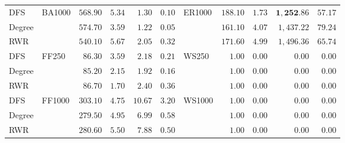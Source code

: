 \begin{table}[b]
{\begin{tabular}{
        |l||
        l|
        r
        r|
        r
        r||
        l|
        r
        r|
        r
        r|
      }
      \hline
      DFS    & \multirow{3}{*}{ BA1000 } & $568.90$                         & $5.34$                           & $1.30$          & $0.10$                           & \multirow{3}{*}{ ER1000 }       & $\mathbf{188.10}$ & $\mathbf{1.73}$ & $\mathbf{1,252}.86$ & $\mathbf{57.17}$ \\
      Degree &                           & $\mathbf{574.70}$                & $\mathbf{3.59}$                  & $\mathbf{1.22}$ & $\mathbf{0.05}$                  &                                 & $161.10$          & $4.07$          & $1,437.22$          & $79.24$          \\
      RWR    &                           & $540.10$                         & $5.67$                           & $2.05$          & $0.32$                           &                                 & $171.60$          & $4.99$          & $1,496.36$          & $65.74$          \\
      \hline
      DFS    & \multirow{3}{*}{ FF250 }  & $\mathbf{86.30}$                 & $\mathbf{3.59}$                  & $2.18$          & $0.21$                           & \multirow{3}{*}{ WS250 }        & $1.00$            & $0.00$          & $0.00$              & $0.00$           \\
      Degree &                           & $85.20$                          & $2.15$                           & $\mathbf{1.92}$ & $\mathbf{0.16}$                  &                                 & $1.00$            & $0.00$          & $0.00$              & $0.00$           \\
      RWR    &                           & $\mathbf{86.70}$                 & $\mathbf{1.70}$                  & $2.40$          & $0.36$                           &                                 & $1.00$            & $0.00$          & $0.00$              & $0.00$           \\
      \hline
      DFS    & \multirow{3}{*}{ FF1000 } & $\mathbf{303.10}$                & $\mathbf{4.75}$                  & $10.67$         & $3.20$                           & \multirow{3}{*}{ WS1000 }       & $1.00$            & $0.00$          & $0.00$              & $0.00$           \\
      Degree &                           & $279.50$                         & $4.95$                           & $6.99$          & $0.58$                           &                                 & $1.00$            & $0.00$          & $0.00$              & $0.00$           \\
      RWR    &                           & $280.60$                         & $5.50$                           & $\mathbf{7.88}$ & $\mathbf{0.50}$                  &                                 & $1.00$            & $0.00$          & $0.00$              & $0.00$           \\
      \hline
    \end{tabular}%
  }
\end{table}

